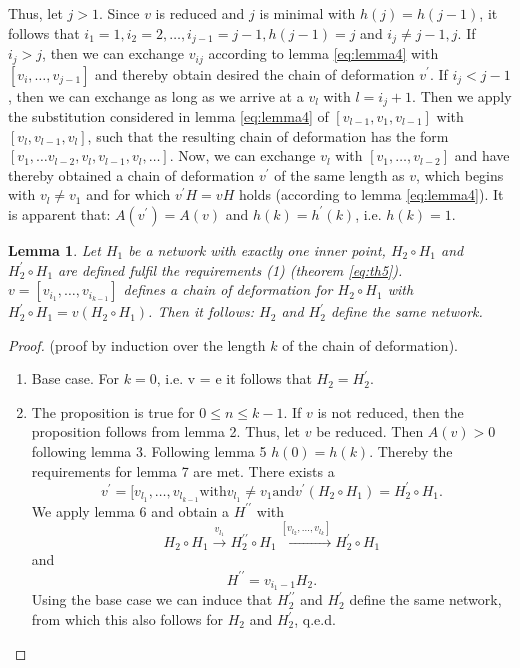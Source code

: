 \documentclass{article}
\newtheorem{lemma}{Lemma}
\begin{document}
Thus, let $j > 1$. Since $v$ is reduced and $j$ is minimal with $h(j) = h(j - 1)$, 
it follows that $i_1 = 1, i_2 = 2, \ldots, i_{j-1} = j - 1, h(j-1) = j$ and $i_j \neq j - 1, j$. If $i_j > j$, 
then we can exchange $v_{ij}$ according to lemma \ref{eq:lemma4} with $[v_i, \ldots, v_{j-1}]$ and thereby obtain desired the chain of deformation $v^{\prime}$.
If $i_j < j - 1$, then we can exchange as long as we arrive at a $v_l$ with $l = i_j + 1$. 
Then we apply the substitution considered in lemma \ref{eq:lemma4} of $[v_{l-1}, v_1, v_{l -1}]$ with $[v_l, v_{l-1}, v_l]$,
such that the resulting chain of deformation has the form $[v_1, \ldots v_{l-2}, v_l, v_{l-1}, v_l, \ldots]$.
Now, we can exchange $v_l$ with $[v_1, \ldots, v_{l-2}]$ and have thereby obtained a chain of deformation $v^{\prime}$ of the same length as $v$, 
which begins with $v_l \neq v_1$ and for which $v^{\prime}H = vH$ holds (according to lemma \ref{eq:lemma4}). It is apparent that: 
$A(v^{\prime})=A(v)$ and $h(k) = h^{\prime}(k)$, i.e. $h(k)=1$.

\begin{lemma}
  Let $H_1$ be a network with exactly one inner point, $H_2 \circ H_1$ and $H^{\prime}_2 \circ H_1$ are defined fulfil the requirements (1) (theorem \ref{eq:th5}). 
  $v = [v_{i_1}, \ldots, v_{i_{k-1}}]$ defines a chain of deformation for $H_2 \circ H_1$ with $H^{\prime}_2 \circ H_1 = v (H_2 \circ H_1)$. 
  Then it follows: $H_2$ and $H^{\prime}_2$ define the same network.
\end{lemma}

\begin{proof}
  (proof by induction over the length $k$ of the chain of deformation). 
  \begin{enumerate}
    \item Base case. For $k = 0$, i.e. v = e it follows that $H_2 = H^{\prime}_2$.
    \item The proposition is true for $0 \leq n \leq k - 1$. If $v$ is not reduced, then the proposition follows from lemma 2. Thus, let $v$ be reduced. 
      Then $A(v) > 0$ following lemma 3. Following lemma 5 $h(0) = h(k)$. Thereby the requirements for lemma 7 are met. 
      There exists a \[v^{\prime} = [v_{l_1}, \ldots, v_{l_{k - 1}} \mbox{with} v_{l_1} \neq v_1 \mbox{and} v^{\prime}(H_2 \circ H_1) = H^{\prime}_2 \circ H_1. \]
      We apply lemma 6 and obtain a $H^{\prime \prime}$ with
      \[ H_2 \circ H_1 \xrightarrow{v_{l_1}} H^{\prime \prime}_2 \circ H_1 \xrightarrow{[v_{l_2}, \ldots, v_{l_k}]} H^{\prime}_2 \circ H_1 \]
      and
      \[ H^{\prime \prime} = v_{i_1 - 1} H_2 \mbox{.} \]
      Using the base case we can induce that $H^{\prime \prime}_2$ and $H^{\prime}_2$ define the same network, 
      from which this also follows for $H_2$ and $H_2^{\prime}$, q.e.d.
    \end{enumerate}

\end{proof}
\end{document}
